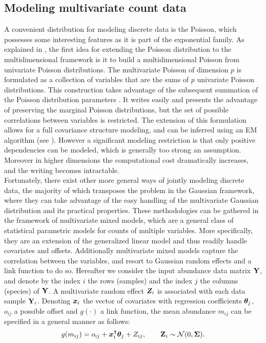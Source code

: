   \subsection{Modeling multivariate count data}
  A convenient distribution for modeling discrete data is the Poisson, which possesses some interesting features as it is part of the exponential family. As explained in \citet{inouye}, the first idea for extending the Poisson distribution to the multidimensional framework is it to build a multidimensional Poisson from univariate Poisson distributions. The multivariate Poisson of dimension $p$ is formulated as a collection of variables that are the sums of $p$ univariate Poisson distributions. This construction  takes advantage of the subsequent summation of the Poisson distribution parameters \citep{T54}. It writes easily and presents the advantage of preserving the marginal Poisson distributions, but the set of possible correlations between variables is restricted. The extension of this formulation allows  for a full covariance structure modeling, and can be inferred using an EM algorithm (see \citet{K03}). However  a significant modeling restriction is that only positive dependencies can be modeled, which is generally too strong an assumption. Moreover in higher dimensions the computational cost dramatically increases, and the writing becomes intractable.  \\

Fortunately, there exist other more general ways of jointly modeling discrete data,  the majority of which transposes the problem in the Gaussian framework, where they can take advantage of the easy handling of the multivariate Gaussian distribution and its practical properties. These methodologies can be gathered in the framework of multivariate mixed models, which are a general class of statistical parametric models for counts of multiple variables. More specifically, they are an extension of the generalized linear model and thus readily handle covariates and offsets. Additionally multivariate mixed models capture the correlation between the variables, and resort to Gaussian random effects and a link function to do so. Hereafter we consider the input abundance data matrix ${\bf Y}$, and denote by the index $i$ the rows (samples) and the index $j$ the columns (species) of ${\bf Y}$. A multivariate random effect ${\boldsymbol{Z}}_i$ is associated with each data sample ${\bf Y}_i$.  Denoting ${\boldsymbol{x}}_i$ the vector of covariates with regression coefficients ${\boldsymbol{\theta}}_j$, $o_{ij}$ a possible offset  and $g(\cdot)$ a link function, the mean abundance $m_{ij}$ can be specified in a general manner as follows:
$$g(m_{ij}) = o_{ij}+{\boldsymbol{x}}_i^\intercal  {\boldsymbol{\theta}}_j + Z_{ij}, \qquad {\bf Z}_i \sim \mathcal{N}(0, {\boldsymbol{\Sigma}}).$$

